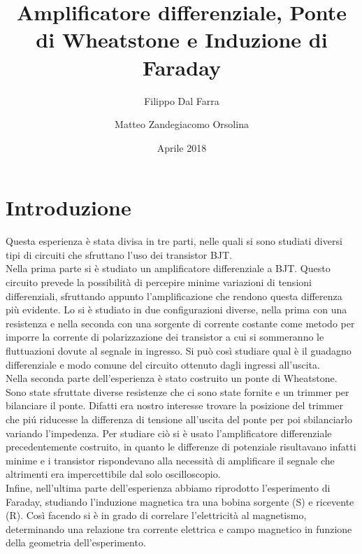 \documentclass{article}
\title{Amplificatore differenziale, Ponte di Wheatstone e Induzione di Faraday}
\author{Filippo Dal Farra \and Matteo Zandegiacomo Orsolina}
\date{Aprile 2018}
\begin{document}
\maketitle

\newpage

\section{Introduzione}
Questa esperienza è stata divisa in tre parti, nelle quali si sono studiati diversi tipi di circuiti che sfruttano l'uso dei transistor BJT.\\
Nella prima parte si è studiato un amplificatore differenziale a BJT. Questo circuito prevede la possibilità di percepire minime variazioni di tensioni differenziali, sfruttando appunto l'amplificazione che rendono questa differenza più evidente. Lo si è studiato in due configurazioni diverse, nella prima con una resistenza e nella seconda con una sorgente di corrente costante come metodo per imporre la corrente di polarizzazione dei transistor a cui si sommeranno le fluttuazioni dovute al segnale in ingresso. Si può così studiare qual è il guadagno differenziale e modo comune del circuito ottenuto dagli ingressi all'uscita.\\

Nella seconda parte dell'esperienza è stato costruito un ponte di Wheatstone. Sono state sfruttate diverse resistenze che ci sono state fornite e un trimmer per bilanciare il ponte. Difatti era nostro interesse trovare la posizione del trimmer che pi\'u riducesse la differenza di tensione all'uscita del ponte per poi sbilanciarlo variando l'impedenza. Per studiare ciò si è usato l'amplificatore differenziale precedentemente costruito, in quanto le differenze di potenziale risultavano infatti minime e i transistor rispondevano alla necessità di amplificare il segnale che altrimenti era impercettibile dal solo oscilloscopio. \\

Infine, nell'ultima parte dell'esperienza abbiamo riprodotto l'esperimento di Faraday, studiando l'induzione magnetica tra una bobina sorgente (S) e ricevente (R). Così facendo si è in grado di correlare l'elettricità al magnetismo, determinando una relazione tra corrente elettrica e campo magnetico in funzione della geometria dell'esperimento.\\

\newpage
\end{document}
